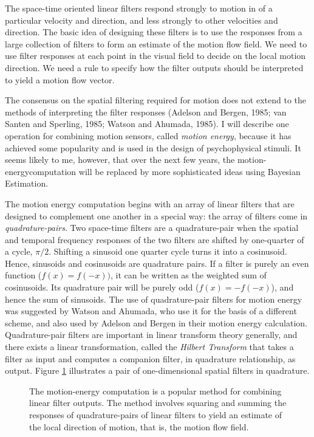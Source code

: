 The space-time oriented linear filters respond
strongly to motion in of a particular
velocity and direction, and less
strongly to other velocities and direction.
The basic idea of designing these filters is to use
the responses from a large collection of filters to
form an estimate of the motion flow field.
We need to use
filter responses at each point
in the visual field to decide
on the local motion direction.
We need a rule to specify how the filter outputs
should be interpreted to yield a motion flow vector.

The consensus on
the spatial filtering required for motion
does not extend
to the methods of interpreting the filter responses
(Adelson and Bergen, 1985; van Santen and Sperling, 1985;
Watson and Ahumada, 1985).
I will describe one
operation for combining motion sensors,
called {\em motion energy},
because it has achieved some popularity and is
used in the design of psychophysical stimuli.
It seems likely to me, however, that over the next few
years, the motion-energycomputation
will be replaced by more sophisticated ideas
using Bayesian Estimation.

The motion energy computation begins with
an array of linear filters that are designed
to complement one another in a special way:
the array of filters come in {\em quadrature-pairs}.
Two space-time filters are a quadrature-pair
when the spatial and temporal frequency responses of the
two filters are shifted by one-quarter of a cycle, $\pi / 2$.
Shifting a sinusoid one quarter cycle
turns it into a cosinusoid.
Hence, sinusoids and cosinusoids are quadrature pairs.
If a filter is purely an even function ($f(x) = f(-x))$,
it can be written as
the weighted sum of cosinusoids.
Its quadrature pair will be
purely odd ($f(x) = -f(-x)$), and hence the sum of sinusoids.
The use of quadrature-pair filters for motion energy
was suggested by Watson and Ahumada, who use it for the
basis of a different scheme,
and also used by Adelson and Bergen in their
motion energy calculation.
Quadrature-pair filters are important in linear transform theory
generally, and
there exists a linear transformation, called the {\em Hilbert
Transform} that takes a filter as input and computes a companion
filter, in quadrature relationship, as output.
Figure \ref{f9:motionEnergy} illustrates a pair of
one-dimensional spatial filters in quadrature.

\begin{figure}
\centerline{
}
\caption[Motion Energy Computation]{
The motion-energy computation is a popular method for
combining linear filter outputs.
The method involves squaring and summing the responses
of quadrature-pairs of
linear filters to yield an estimate of the local direction
of motion, that is, the motion flow field.
}
\label{f9:motionEnergy}
\end{figure}

